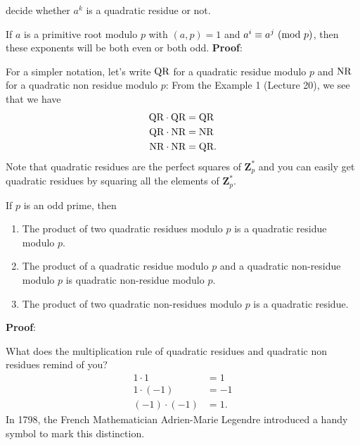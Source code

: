 decide whether $ a^k $ is a quadratic residue or not.
\begin{Proposition}{}{}
    If $ a $ is a primitive root modulo $ p $ with $ (a,p)=1 $ and $ a^i\equiv a^j\ (\mathrm{mod}\ p) $,
    then these exponents will be both even or both odd.
    \tcblower{}
    \textbf{Proof}:
\end{Proposition}
For a simpler notation, let's write $\text{QR}$ for a quadratic residue modulo $p$ and $\text{NR}$
for a quadratic non residue modulo $p$: From the Example 1 (Lecture 20), we see that we have
\begin{align*}
    \text{QR}\cdot \text{QR} & =\text{QR}  \\
    \text{QR}\cdot \text{NR} & =\text{NR}  \\
    \text{NR}\cdot \text{NR} & =\text{QR}.
\end{align*}
Note that quadratic residues are the perfect squares of $ \mathbf{Z}_p^* $ and you can easily
get quadratic residues by squaring all the elements of $ \mathbf{Z}_p^* $.
\begin{Proposition}{}{}
    If $ p $ is an odd prime, then
    \begin{enumerate}[(1)]
        \item The product of two quadratic residues modulo $p$ is a quadratic residue
              modulo $p$.
        \item The product of a quadratic residue modulo $p$ and a quadratic non-residue
              modulo $p$ is quadratic non-residue modulo $p$.
        \item The product of two quadratic non-residues modulo $p$ is a quadratic residue.
    \end{enumerate}
    \tcblower{}
    \textbf{Proof}:
\end{Proposition}
What does the multiplication rule of quadratic residues and quadratic non
residues remind of you?
\begin{align*}
    1\cdot 1       & =1  \\
    1\cdot (-1)    & =-1 \\
    (-1)\cdot (-1) & =1.
\end{align*}
In 1798, the French Mathematician Adrien-Marie Legendre introduced a handy
symbol to mark this distinction.

